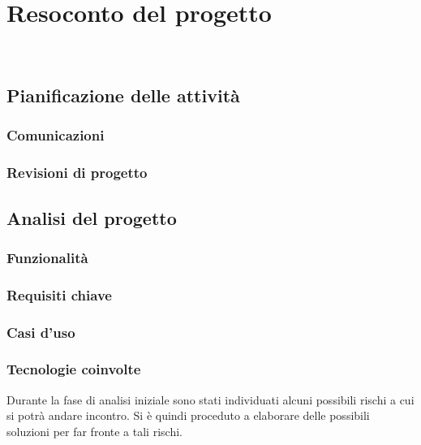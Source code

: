 
\chapter{Resoconto del progetto}
\label{cap:resoconto-progetto}

\\

\section{Pianificazione delle attività}
\subsection{Comunicazioni}
\subsection{Revisioni di progetto}

\section{Analisi del progetto}
\subsection{Funzionalità}
\subsection{Requisiti chiave}
\subsection{Casi d'uso}
\subsection{Tecnologie coinvolte}

Durante la fase di analisi iniziale sono stati individuati alcuni possibili rischi a cui si potrà andare incontro.
Si è quindi proceduto a elaborare delle possibili soluzioni per far fronte a tali rischi.\\

